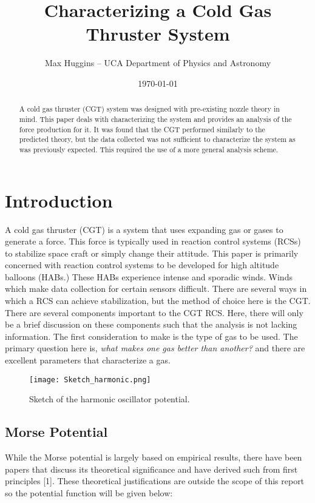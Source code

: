 \documentclass[letterpaper,12pt]{article}
\begin{document}
\title{Characterizing a Cold Gas Thruster System}
\author{Max Huggins – UCA Department of Physics and Astronomy}
\date{\today}
\maketitle


\begin{abstract}
A cold gas thruster (CGT) system was designed with pre-existing nozzle theory in mind. This paper deals with characterizing the system and provides an analysis of the force production for it. It was found that the CGT performed similarly to the predicted theory, but the data collected was not sufficient to characterize the system as was previously expected. This required the use of a more general analysis scheme.
\end{abstract}


\section{Introduction}
A cold gas thruster (CGT) is a system that uses expanding gas or gases to generate a force. This force is typically used in reaction control systems (RCSs) to stabilize space craft or simply change their attitude. This paper is primarily concerned with reaction control systems to be developed for high altitude balloons (HABs.) These HABs experience intense and sporadic winds. Winds which make data collection for certain sensors difficult. There are several ways in which a RCS can achieve stabilization, but the method of choice here is the CGT.\\
There are several components important to the CGT RCS. Here, there will only be a brief discussion on these components such that the analysis is not lacking information. The first consideration to make is the type of gas to be used. The primary question here is, \textit{what makes one gas better than another?} and there are excellent parameters that characterize a gas. 

\begin{figure}[!h]
\centering
\texttt{[image: Sketch\_harmonic.png]}
\caption{Sketch of the harmonic oscillator potential.}
\label{figure 1}
\end{figure}\newline



\subsection{Morse Potential}
While the Morse potential is largely based on empirical results, there have been papers that discuss its theoretical significance and have derived such from first principles [1]. These theoretical justifications are outside the scope of this report so the potential function will be given below:
\end{document}
